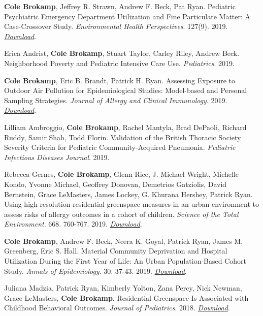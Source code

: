 \textbf{Cole Brokamp}, Jeffrey R. Strawn, Andrew F. Beck, Pat Ryan.
Pediatric Psychiatric Emergency Department Utilization and Fine
Particulate Matter: A Case-Crossover Study. \emph{Environmental Health
Perspectives}. 127(9). 2019.
\href{https://s3.amazonaws.com/colebrokamp-website/publications/Brokamp_EHP_2019.pdf}{\emph{Download}}.

Erica Andrist, \textbf{Cole Brokamp}, Stuart Taylor, Carley Riley,
Andrew Beck. Neighborhood Poverty and Pediatric Intensive Care Use.
\emph{Pediatrics}. 2019.

\textbf{Cole Brokamp}, Eric B. Brandt, Patrick H. Ryan. Assessing
Exposure to Outdoor Air Pollution for Epidemiological Studies:
Model-based and Personal Sampling Strategies. \emph{Journal of Allergy
and Clinical Immunology}. 2019.
\href{https://colebrokamp-website.s3.amazonaws.com/publications/Brokamp_JACI_2019.pdf}{\emph{Download}}.

Lilliam Ambroggio, \textbf{Cole Brokamp}, Rachel Mantyla, Brad DePaoli,
Richard Ruddy, Samir Shah, Todd Florin. Validation of the British
Thoracic Society Severity Criteria for Pediatric Community-Acquired
Pneumonia. \emph{Pediatric Infectious Diseases Journal}. 2019.

Rebecca Gernes, \textbf{Cole Brokamp}, Glenn Rice, J. Michael Wright,
Michelle Kondo, Yvonne Michael, Geoffrey Donovan, Demetrios Gatziolis,
David Bernstein, Grace LeMasters, James Lockey, G. Khurana Hershey,
Patrick Ryan. Using high-resolution residential greenspace measures in
an urban environment to assess risks of allergy outcomes in a cohort of
children. \emph{Science of the Total Environment}. 668. 760-767. 2019.
\href{https://colebrokamp-website.s3.amazonaws.com/publications/Gernes-Using\%20high-resolution\%20residential\%20greenspace\%20measures\%20in\%20an\%20urban\%20environment\%20to\%20assess\%20risks\%20of\%20allergy\%20outcomes\%20in\%20children-STE2019.pdf}{\emph{Download}}.

\textbf{Cole Brokamp}, Andrew F. Beck, Neera K. Goyal, Patrick Ryan,
James M. Greenberg, Eric S. Hall. Material Community Deprivation and
Hospital Utilization During the First Year of Life: An Urban
Population-Based Cohort Study. \emph{Annals of Epidemiology}. 30. 37-43.
2019.
\href{https://colebrokamp-website.s3.amazonaws.com/publications/Brokamp_AoE_2019.pdf}{\emph{Download}}.

Juliana Madzia, Patrick Ryan, Kimberly Yolton, Zana Percy, Nick Newman,
Grace LeMasters, \textbf{Cole Brokamp}. Residential Greenspace Is
Associated with Childhood Behavioral Outcomes. \emph{Journal of
Pediatrics}. 2018.
\href{https://colebrokamp-website.s3.amazonaws.com/publications/Madzia_JPeds_2018.pdf}{\emph{Download}}.

